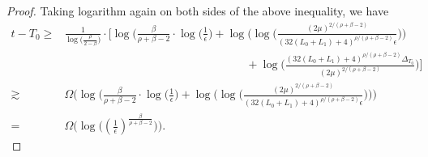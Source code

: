 \documentclass[10pt]{article} %
\newtheorem{proof}{Proof}
\begin{document}
\begin{proof}
    Taking logarithm again on both sides of the above inequality, we have
    \begin{align}
        t-T_0
        \geq& \frac{1}{\log\big(\frac{\rho}{2-\beta})}\cdot\Big[\log\Big(\frac{\beta}{\rho+\beta-2}\cdot\log\Big(\frac{1}{\epsilon}\Big)+\log\Big(\log\Big(\frac{(2\mu)^{2/(\rho+\beta-2)}}{(32(L_0+L_1)+4)^{{\rho}/{(\rho+\beta-2)}}\epsilon}\Big)\Big)\nonumber\\
        &\qquad\qquad\qquad\qquad\qquad\qquad \qquad\qquad+\log\Big(\frac{(32(L_0+L_1)+4)^{{\rho}/{(\rho+\beta-2)}}\Delta_{T_0}}{(2\mu)^{2/(\rho+\beta-2)}}\Big)\Big]\nonumber\\
        \gtrsim  &\Omega\Big(\log\Big(\frac{\beta}{\rho+\beta-2}\cdot\log\Big(\frac{1}{\epsilon}\Big)+\log\Big(\log\Big(\frac{(2\mu)^{2/(\rho+\beta-2)}}{(32(L_0+L_1)+4)^{\rho/(\rho+\beta-2)}\epsilon}\Big)\Big)\Big) \nonumber\\
        =&\Omega \big(\log\big((\frac{1}{\epsilon})^{\frac{\beta}{\rho+\beta-2}}\big)\big). \nonumber
    \end{align}



\end{proof}
\end{document}
